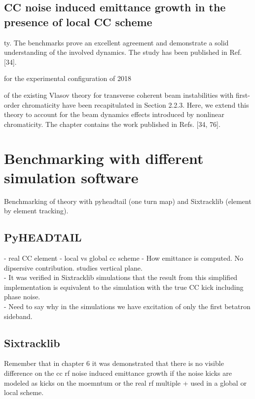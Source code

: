 \subsection{CC noise induced emittance growth in the presence of local CC scheme}\label{subsec:local_CC}

\newpage



ty. The
benchmarks prove an excellent agreement and demonstrate a solid understanding of the involved
dynamics. The study has been published in Ref. [34].


for the experimental configuration of 2018 

of the existing Vlasov theory for transverse coherent beam instabilities with first-order
chromaticity have been recapitulated in Section 2.2.3. Here, we extend this theory to account for the
beam dynamics effects introduced by nonlinear chromaticity. The chapter contains the work published
in Refs. [34, 76].




\section{Benchmarking with different simulation software}
Benchmarking of theory with pyheadtail (one turn map) and Sixtracklib (element by element tracking).



\subsection{PyHEADTAIL}
- real CC element
- local vs global cc scheme
- How emittance is computed. No dipsersive contribution. studies vertical plane. \\
- It was verified in Sixtracklib simulations that the result from this simplified implementation is equivalent to the simulation with the true CC kick including phase noise.\\
- Need to say why in the simulations we have excitation of only the first betatron sideband. \\
\subsection{Sixtracklib}

Remember that in chapter 6 it was demonstrated that there is no visible difference on the cc rf noise induced emittance growth if the noise kicks are modeled as kicks on the moemntum or the real rf multiple + used in a global or local scheme.


